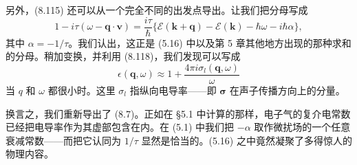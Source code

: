 另外，(8.115) 还可以从一个完全不同的出发点导出。让我们把分母写成
\begin{equation*}
1-i\tau(\omega-\mathbf{q}\cdot\mathbf{v}) = \frac{i\tau}{\hbar}\bigl\{\mathcal{E}(\mathbf{k}+\mathbf{q}) - \mathcal{E}(\mathbf{k}) - \hbar\omega - i\hbar\alpha\bigr\}, \tag{8.119}
\end{equation*}
其中 $\alpha=-1/\tau$。我们认出，这正是 (5.16) 中以及第 5 章其他地方出现的那种求和的分母。稍加变换，并利用 (8.118)，我们发现可以写成
\begin{equation*}
\epsilon(\mathbf{q},\omega) \approx 1 + \frac{4\pi i\sigma_l(\mathbf{q},\omega)}{\omega} \tag{8.120}
\end{equation*}
当 $q$ 和 $\omega$ 都很小时。这里 $\sigma_l$ 指纵向电导率——即 $\boldsymbol{\sigma}$ 在声子传播方向上的分量。

换言之，我们重新导出了 (8.7)。正如在 §5.1 中计算的那样，电子气的复介电常数已经把电导率作为其虚部包含在内。在 (5.1) 中我们把 $-\alpha$ 取作微扰场的一个任意衰减常数——而把它认同为 $1/\tau$ 显然是恰当的。(5.16) 之中竟然凝聚了多得惊人的物理内容。

